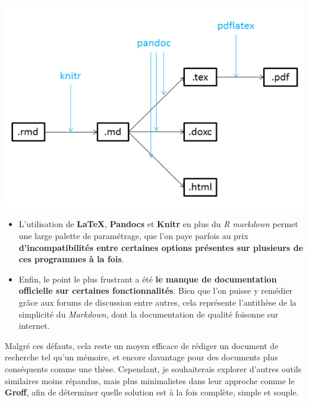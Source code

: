 \documentclass[
  11pt,
  french,
]{article}
\newcounter{customfigs}[section]
\newenvironment{customfigs}[1][] {
    \stepcounter{customfigs}
    Fig \arabic{section}. \arabic{customfigs} : }
\newcommand{\masked}{\vspace*{-\baselineskip}}
\begin{document}
\begin{tcolorbox}[title=\begin{customfigs} Outils et formats intermédiaires utilisés pour générer un fichier PDF \end{customfigs}]

\begin{center}\includegraphics[width=1\linewidth]{__imgs/pandoc1} \end{center}

\end{tcolorbox}

\begin{itemize}
\item
  L'utilisation de \textbf{LaTeX}, \textbf{Pandocs} et \textbf{Knitr} en
  plus du \emph{R markdown} permet une large palette de paramétrage, que
  l'on paye parfois au prix \textbf{d'incompatibilités entre certaines
  options présentes sur plusieurs de ces programmes à la fois}.
\item
  Enfin, le point le plus frustrant a été \textbf{le manque de
  documentation officielle sur certaines fonctionnalités}. Bien que l'on
  puisse y remédier grâce aux forums de discussion entre autres, cela
  représente l'antithèse de la simplicité du \emph{Markdown}, dont la
  documentation de qualité foisonne sur internet.
\end{itemize}

Malgré ces défauts, cela reste un moyen efficace de rédiger un document
de recherche tel qu'un mémoire, et encore davantage pour des documents
plus conséquents comme une thèse. Cependant, je souhaiterais explorer
d'autres outils similaires moins répandus, mais plus minimalistes dans
leur approche comme le \textbf{Groff}, afin de déterminer quelle
solution est à la fois complète, simple et souple.
\end{document}
